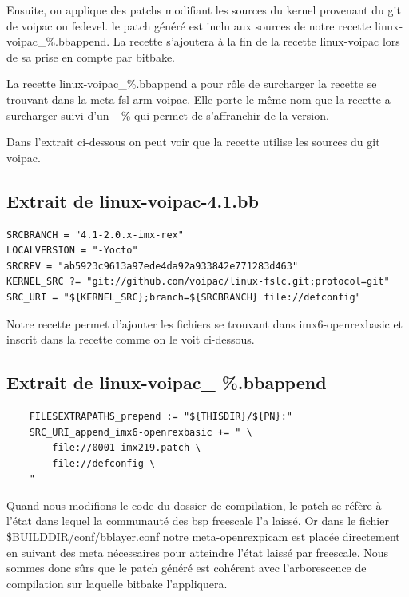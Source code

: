 Ensuite, on applique des patchs modifiant les sources du kernel provenant
du git de voipac ou fedevel. le patch généré est inclu aux sources de notre recette
linux-voipac\_\%.bbappend. La recette s'ajoutera à la fin de la recette linux-voipac lors de
sa prise en compte par bitbake. \medskip

La recette linux-voipac\_\%.bbappend a pour rôle de surcharger la recette se trouvant dans
la meta-fsl-arm-voipac. Elle porte le même nom que la recette a surcharger suivi d’un \_\%
qui permet de s’affranchir de la version. \medskip

Dans l’extrait ci-dessous on peut voir que la recette utilise les sources du git voipac.

\subsection{Extrait de linux-voipac-4.1.bb}

\begin{lstlisting}
SRCBRANCH = "4.1-2.0.x-imx-rex"
LOCALVERSION = "-Yocto"
SRCREV = "ab5923c9613a97ede4da92a933842e771283d463"
KERNEL_SRC ?= "git://github.com/voipac/linux-fslc.git;protocol=git"
SRC_URI = "${KERNEL_SRC};branch=${SRCBRANCH} file://defconfig"
\end{lstlisting}

Notre recette permet d’ajouter les fichiers se trouvant dans imx6-openrexbasic et inscrit
dans la recette comme on le voit ci-dessous.

\subsection{Extrait de linux-voipac\_ \%.bbappend}

\begin{lstlisting}
    FILESEXTRAPATHS_prepend := "${THISDIR}/${PN}:"
    SRC_URI_append_imx6-openrexbasic += " \
        file://0001-imx219.patch \
        file://defconfig \
    "
\end{lstlisting}

Quand nous modifions le code du dossier de compilation, le patch se réfère à l’état dans
lequel la communauté des bsp freescale l’a laissé. Or dans le fichier
\$BUILDDIR/conf/bblayer.conf notre meta-openrexpicam est placée directement en suivant
des meta nécessaires pour atteindre l’état laissé par freescale. Nous sommes donc sûrs
que le patch généré est cohérent avec l’arborescence de compilation sur laquelle bitbake
l’appliquera.

